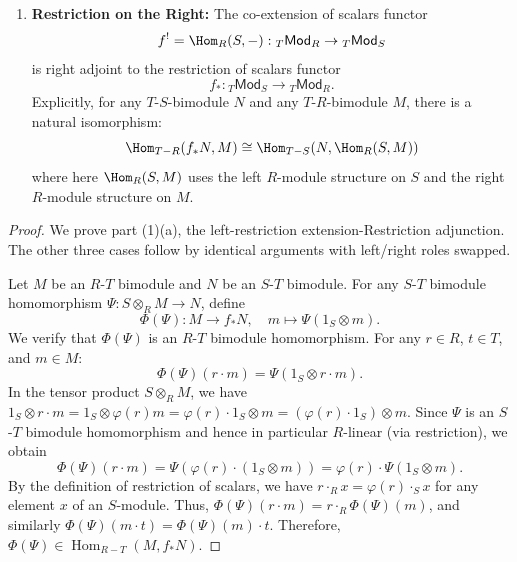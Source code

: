 \begin{theorem}
\begin{enumerate}
\begin{enumerate}
        \item \textbf{Restriction on the Right:} The co-extension of scalars functor
        \[ f^! = \Hom_R(S, -) : {}_T\mathsf{Mod}_R \to {}_T\mathsf{Mod}_S \]
        is right adjoint to the restriction of scalars functor
        \[ f_* : {}_T\mathsf{Mod}_S \to {}_T\mathsf{Mod}_R. \]
        Explicitly, for any $T$-$S$-bimodule $N$ and any $T$-$R$-bimodule $M$, there is a natural isomorphism:
        \[ \Hom_{T-R}(f_*N, M) \cong \Hom_{T-S}(N, \Hom_R(S, M)) \]
        where here $\Hom_R(S, M)$ uses the left $R$-module structure on $S$ and the right $R$-module structure on $M$.
    \end{enumerate}
\end{enumerate}
\end{theorem}

\begin{proof}
    We prove part (1)(a), the left-restriction extension-Restriction adjunction. The other three cases follow by identical arguments with left/right roles swapped.

    Let $M$ be an $R$-$T$ bimodule and $N$ be an $S$-$T$ bimodule. For any $S$-$T$ bimodule homomorphism $\Psi : S \otimes_R M \to N$, define
    $$\Phi(\Psi) : M \to f_*N, \quad m \mapsto \Psi(1_S \otimes m).$$
    We verify that $\Phi(\Psi)$ is an $R$-$T$ bimodule homomorphism. For any $r \in R$, $t \in T$, and $m \in M$:
    $$\Phi(\Psi)(r \cdot m) = \Psi(1_S \otimes r \cdot m).$$
    In the tensor product $S \otimes_R M$, we have $1_S \otimes r \cdot m = 1_S \otimes \varphi(r)m = \varphi(r) \cdot 1_S \otimes m = (\varphi(r) \cdot 1_S) \otimes m$. Since $\Psi$ is an $S$-$T$ bimodule homomorphism and hence in particular $R$-linear (via restriction), we obtain
    $$\Phi(\Psi)(r \cdot m) = \Psi(\varphi(r) \cdot (1_S \otimes m)) = \varphi(r) \cdot \Psi(1_S \otimes m).$$
    By the definition of restriction of scalars, we have $r \cdot_R x = \varphi(r) \cdot_S x$ for any element $x$ of an $S$-module. Thus, $\Phi(\Psi)(r \cdot m) = r \cdot_R \Phi(\Psi)(m)$, and similarly $\Phi(\Psi)(m \cdot t) = \Phi(\Psi)(m) \cdot t$. Therefore, $\Phi(\Psi) \in \operatorname{Hom}_{R-T}(M, f_*N)$.


\end{proof}
